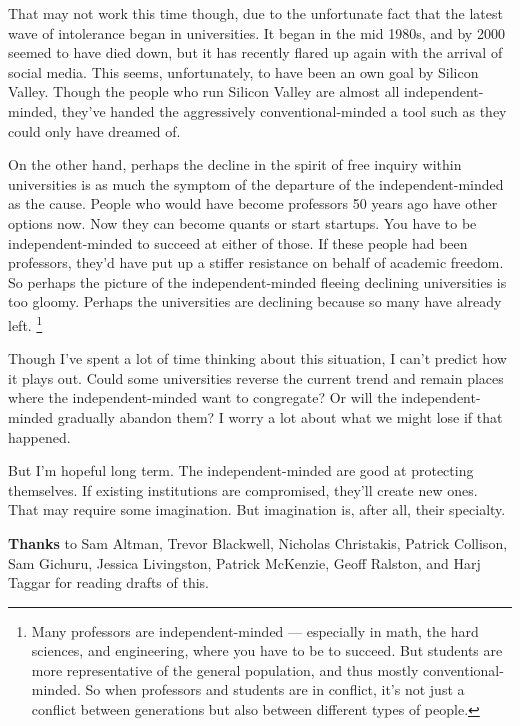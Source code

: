 That may not work this time though, due to the unfortunate fact that the
latest wave of intolerance began in universities. It began in the mid
1980s, and by 2000 seemed to have died down, but it has recently flared
up again with the arrival of social media. This seems, unfortunately, to
have been an own goal by Silicon Valley. Though the people who run
Silicon Valley are almost all independent-minded, they've handed the
aggressively conventional-minded a tool such as they could only have
dreamed of.

On the other hand, perhaps the decline in the spirit of free inquiry
within universities is as much the symptom of the departure of the
independent-minded as the cause. People who would have become professors
50 years ago have other options now. Now they can become quants or start
startups. You have to be independent-minded to succeed at either of
those. If these people had been professors, they'd have put up a stiffer
resistance on behalf of academic freedom. So perhaps the picture of the
independent-minded fleeing declining universities is too gloomy. Perhaps
the universities are declining because so many have already left.
\footnote{Many professors are independent-minded --- especially in math,
the hard sciences, and engineering, where you have to be to succeed. But
students are more representative of the general population, and thus
mostly conventional-minded. So when professors and students are in
conflict, it's not just a conflict between generations but also between
different types of people.}

Though I've spent a lot of time thinking about this situation, I can't
predict how it plays out. Could some universities reverse the current
trend and remain places where the independent-minded want to congregate?
Or will the independent-minded gradually abandon them? I worry a lot
about what we might lose if that happened.

But I'm hopeful long term. The independent-minded are good at protecting
themselves. If existing institutions are compromised, they'll create new
ones. That may require some imagination. But imagination is, after all,
their specialty.


\textbf{Thanks} to Sam Altman, Trevor Blackwell, Nicholas Christakis,
Patrick Collison, Sam Gichuru, Jessica Livingston, Patrick McKenzie,
Geoff Ralston, and Harj Taggar for reading drafts of this.